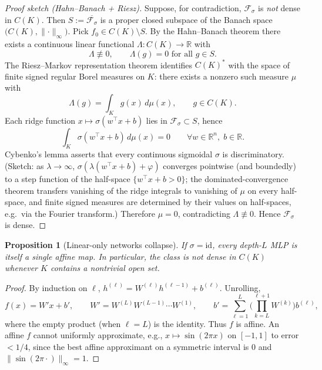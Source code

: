 \documentclass[11pt]{article}
\newtheorem{proposition}[theorem]{Proposition}
\theoremstyle{remark}
\begin{document}
\begin{proof}[Proof sketch (Hahn--Banach + Riesz)]
Suppose, for contradiction, $\mathcal{F}_\sigma$ is \emph{not} dense in $C(K)$. Then $S := \overline{\mathcal{F}_\sigma}$ is a proper closed subspace of the Banach space $\big(C(K), \lVert \cdot \rVert_\infty\big)$. Pick $f_0 \in C(K) \setminus S$. By the Hahn--Banach theorem there exists a continuous linear functional $\Lambda : C(K) \to \mathbb{R}$ with
\[
\Lambda \not\equiv 0, \qquad \Lambda(g) = 0 \text{ for all } g \in S.
\]
The Riesz--Markov representation theorem identifies $C(K)^*$ with the space of finite signed regular Borel measures on $K$: there exists a nonzero such measure $\mu$ with
\[
\Lambda(g) = \int_K g(x)\, d\mu(x), \qquad g \in C(K).
\]
Each ridge function $x \mapsto \sigma(w^\top x + b)$ lies in $\mathcal{F}_\sigma \subset S$, hence
\[
\int_K \sigma(w^\top x + b)\, d\mu(x) = 0 \qquad \forall w \in \mathbb{R}^n,\; b \in \mathbb{R}.
\]
Cybenko's lemma asserts that every continuous sigmoidal $\sigma$ is discriminatory. (Sketch: as $\lambda \to \infty$, $\sigma(\lambda(w^\top x + b) + \varphi)$ converges pointwise (and boundedly) to a step function of the half-space $\{w^\top x + b > 0\}$; the dominated-convergence theorem transfers vanishing of the ridge integrals to vanishing of $\mu$ on every half-space, and finite signed measures are determined by their values on half-spaces, e.g.\ via the Fourier transform.) Therefore $\mu = 0$, contradicting $\Lambda \not\equiv 0$. Hence $\mathcal{F}_\sigma$ is dense.
\end{proof}

\begin{proposition}[Linear-only networks collapse]\label{prop:linear-collapse}
If $\sigma = \mathrm{id}$, every depth-$L$ MLP is itself a single affine map. In particular, the class is not dense in $C(K)$ whenever $K$ contains a nontrivial open set.
\end{proposition}

\begin{proof}
By induction on $\ell$, $h^{(\ell)} = W^{(\ell)} h^{(\ell-1)} + b^{(\ell)}$. Unrolling,
\[
f(x) = W' x + b', \qquad W' = W^{(L)} W^{(L-1)} \cdots W^{(1)}, \qquad b' = \sum_{\ell=1}^{L} \!\Big(\!\!\prod_{k=L}^{\ell+1} W^{(k)}\!\Big) b^{(\ell)},
\]
where the empty product (when $\ell = L$) is the identity. Thus $f$ is affine. An affine $f$ cannot uniformly approximate, e.g., $x \mapsto \sin(2\pi x)$ on $[-1,1]$ to error $< 1/4$, since the best affine approximant on a symmetric interval is $0$ and $\lVert \sin(2\pi \cdot)\rVert_\infty = 1$.
\end{proof}
\end{document}
